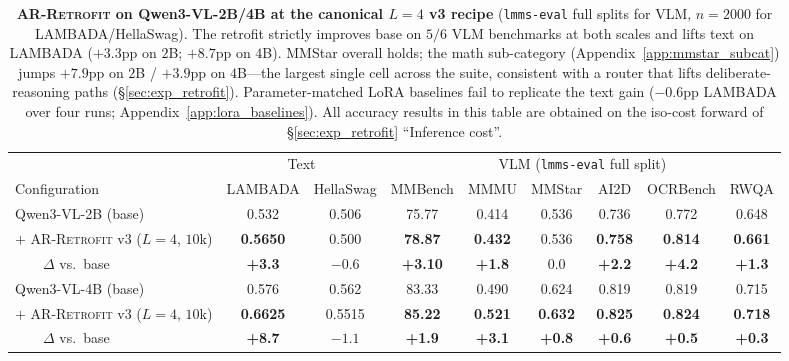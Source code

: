 \documentclass{article}
\newcommand{\retrofit}{\textsc{AR-Retrofit}}
\begin{document}
\begin{table}[t]
\caption{\textbf{\retrofit{} on Qwen3-VL-2B/4B at the canonical $L{=}4$ v3 recipe} (\texttt{lmms-eval} full splits for VLM, $n{=}2000$ for LAMBADA/HellaSwag). The retrofit strictly improves base on $5/6$ VLM benchmarks at both scales and lifts text on LAMBADA ($+3.3$pp on $2$B; $+8.7$pp on $4$B). MMStar overall holds; the math sub-category (Appendix~\ref{app:mmstar_subcat}) jumps $+7.9$pp on $2$B / $+3.9$pp on $4$B---the largest single cell across the suite, consistent with a router that lifts deliberate-reasoning paths (\S\ref{sec:exp_retrofit}). Parameter-matched LoRA baselines fail to replicate the text gain ($-0.6$pp LAMBADA over four runs; Appendix~\ref{app:lora_baselines}). All accuracy results in this table are obtained on the iso-cost forward of \S\ref{sec:exp_retrofit} ``Inference cost''.}
\label{tab:retrofit_main}
\centering\small
\setlength{\tabcolsep}{4pt}
\begin{tabular}{lcccccccc}
\toprule
& \multicolumn{2}{c}{Text} & \multicolumn{6}{c}{VLM (\texttt{lmms-eval} full split)} \\
\cmidrule(lr){2-3}\cmidrule(lr){4-9}
Configuration & LAMBADA & HellaSwag & MMBench & MMMU & MMStar & AI2D & OCRBench & RWQA \\
\midrule
Qwen3-VL-2B (base)                    & 0.532 & 0.506 & 75.77 & 0.414 & 0.536 & 0.736 & 0.772 & 0.648 \\
$+$ \retrofit{} v3 ($L{=}4$, $10$k)   & \textbf{0.5650} & 0.500   & \textbf{78.87} & \textbf{0.432} & 0.536 & \textbf{0.758} & \textbf{0.814} & \textbf{0.661} \\
~~~~$\Delta$ vs.\ base                & \textbf{+3.3}   & $-0.6$  & \textbf{+3.10} & \textbf{+1.8} & $0.0$  & \textbf{+2.2}  & \textbf{+4.2}  & \textbf{+1.3}  \\
\midrule
Qwen3-VL-4B (base)                    & 0.576 & 0.562 & 83.33 & 0.490 & 0.624 & 0.819 & 0.819 & 0.715 \\
$+$ \retrofit{} v3 ($L{=}4$, $10$k)   & \textbf{0.6625} & 0.5515 & \textbf{85.22} & \textbf{0.521} & \textbf{0.632} & \textbf{0.825} & \textbf{0.824} & \textbf{0.718} \\
~~~~$\Delta$ vs.\ base                & \textbf{+8.7}   & $-1.1$ & \textbf{+1.9}  & \textbf{+3.1}  & \textbf{+0.8}  & \textbf{+0.6}  & \textbf{+0.5}  & \textbf{+0.3}  \\
\bottomrule
\end{tabular}
\end{table}
\end{document}
